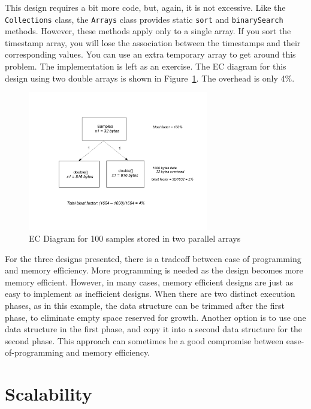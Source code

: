 \documentclass{book}
\theoremstyle{definition}
\begin{document}
This design requires a bit more code, but, again, it is not excessive. Like the \texttt{Collections} class, the \texttt{Arrays} class provides static \texttt{sort} and  \texttt{binarySearch} methods. However, these methods apply only to a single array. If you sort the timestamp array, you will lose the association between the timestamps and their corresponding values. You can use an extra temporary array to get around this problem. The implementation is left as an exercise. The EC diagram for this design using two double arrays is shown in 
Figure~\ref{fig:content-schematic-arrays-doubles}. The overhead is only 4\%. 

\begin{figure}
  \centering
  \includegraphics[width=0.7\textwidth]{Figures/chapter3/array-doubles}
  \caption{EC Diagram for 100 samples stored in two parallel arrays}
  \label{fig:content-schematic-arrays-doubles}
\end{figure}

For the three designs presented, there is a tradeoff between ease of programming and memory efficiency. More programming is needed as the design becomes more memory efficient. However, in many cases, memory efficient designs are just as easy to implement as inefficient designs. When there are two distinct execution phases, as in this example, the data structure can be trimmed after the first phase, to eliminate empty space reserved for growth. Another option is to use one data structure in the first phase, and copy it into a second data structure for the second phase. This approach can sometimes be a good compromise between ease-of-programming and memory efficiency.
 
\section{Scalability}
\label{scalability}
\end{document}

